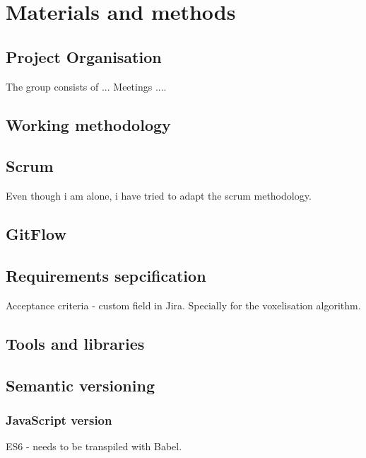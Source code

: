 \chapter[Method]{Materials and methods}



\section{Project Organisation}
The group consists of ...
Meetings ....

\section{Working methodology}
\section{Scrum}
Even though i am alone, i have tried to adapt the scrum methodology.

\section{GitFlow}

\section{Requirements sepcification}
Acceptance criteria - custom field in Jira.
Specially for the voxelisation algorithm.

\section{Tools and libraries}

\section{Semantic versioning}

\subsection{JavaScript version}
ES6 - needs to be transpiled with Babel.

